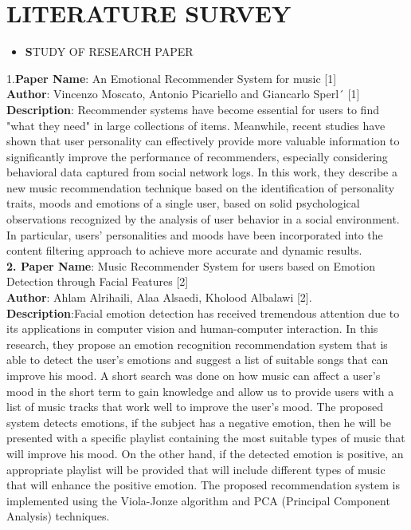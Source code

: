 \documentclass[12pt]{report}
\begin{document}
\centering
\section{LITERATURE SURVEY}


\justifying
\setlength{\parindent}{4em}
\setlength{\parskip}{0.5em}
\renewcommand{\baselinestretch}{1.5}
\normalsize
\begin{itemize}
\item \textbf STUDY OF RESEARCH PAPER
\end{itemize}
1.\textbf{Paper Name}:  An Emotional Recommender System for music [1]\\
\textbf{Author}:  Vincenzo Moscato, Antonio Picariello and Giancarlo Sperl´ [1]\\
\textbf{Description}: Recommender systems have become essential for users to find "what they need" 
in large collections of items. Meanwhile, recent studies have shown that user personality can 
effectively provide more valuable information to significantly improve the performance of 
recommenders, especially considering behavioral data captured from social network logs. In 
this work, they describe a new music recommendation technique based on the identification of 
personality traits, moods and emotions of a single user, based on solid psychological 
observations recognized by the analysis of user behavior in a social environment. In particular, 
users' personalities and moods have been incorporated into the content filtering approach to 
achieve more accurate and dynamic results.\\ 

\setlength{\parindent}{0em}
\textbf{2. Paper Name}:  Music Recommender System for users based on Emotion Detection through 
Facial Features [2]\\
\textbf{Author}:  Ahlam Alrihaili, Alaa Alsaedi, Kholood Albalawi [2].\\
\textbf{Description}:Facial emotion detection has received tremendous attention due to its 
applications in computer vision and human-computer interaction. In this research, they 
propose an emotion recognition recommendation system that is able to detect the user's 
emotions and suggest a list of suitable songs that can improve his mood. A short search was 
done on how music can affect a user's mood in the short term to gain knowledge and allow us 
to provide users with a list of music tracks that work well to improve the user's mood. The 
proposed system detects emotions, if the subject has a negative emotion, then he will be 
presented with a specific playlist containing the most suitable types of music that will improve 
his mood. On the other hand, if the detected emotion is positive, an appropriate playlist will 
be provided that will include different types of music that will enhance the positive emotion. 
The proposed recommendation system is implemented using the Viola-Jonze algorithm and 
PCA (Principal Component Analysis) techniques.\\
\end{document}
